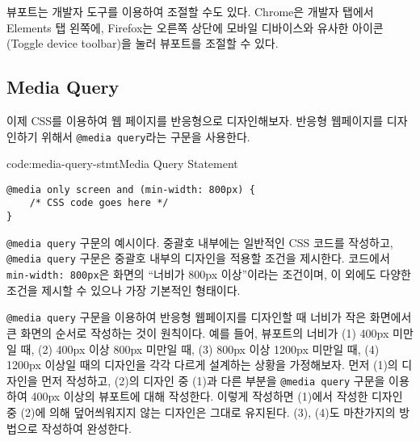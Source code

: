 뷰포트는 개발자 도구를 이용하여 조절할 수도 있다. Chrome은 개발자 탭에서 Elements 탭 왼쪽에, Firefox는 오른쪽 상단에 모바일 디바이스와 유사한 아이콘(Toggle device toolbar)을 눌러 뷰포트를 조절할 수 있다.

\subsection*{Media Query}
이제 CSS를 이용하여 웹 페이지를 반응형으로 디자인해보자. 반응형 웹페이지를 디자인하기 위해서 \texttt{@media query}라는 구문을 사용한다.

\begin{codeenv}{code:media-query-stmt}{Media Query Statement}\begin{verbatim}
@media only screen and (min-width: 800px) {
    /* CSS code goes here */   
}
\end{verbatim}
\end{codeenv}

\는 \texttt{@media query} 구문의 예시이다. 중괄호 내부에는 일반적인 CSS 코드를 작성하고, \texttt{@media query} 구문은 중괄호 내부의 디자인을 적용할 조건을 제시한다. 코드에서 \texttt{min-width: 800px}은 화면의 ``너비가 800px 이상''이라는 조건이며, 이 외에도 다양한 조건을 제시할 수 있으나 \가 가장 기본적인 형태이다.

\texttt{@media query} 구문을 이용하여 반응형 웹페이지를 디자인할 때 너비가 작은 화면에서 큰 화면의 순서로 작성하는 것이 원칙이다. 예를 들어, 뷰포트의 너비가 (1) 400px 미만일 때, (2) 400px 이상 800px 미만일 때, (3) 800px 이상 1200px 미만일 때, (4) 1200px 이상일 때의 디자인을 각각 다르게 설계하는 상황을 가정해보자. 먼저 (1)의 디자인을 먼저 작성하고, (2)의 디자인 중 (1)과 다른 부분을 \texttt{@media query} 구문을 이용하여 400px 이상의 뷰포트에 대해 작성한다. 이렇게 작성하면 (1)에서 작성한 디자인 중 (2)에 의해 덮어씌워지지 않는 디자인은 그대로 유지된다. (3), (4)도 마찬가지의 방법으로 작성하여 완성한다.
